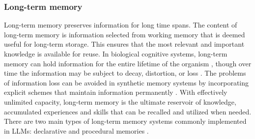 \documentclass[10pt,journal,compsoc]{IEEEtran}
\begin{document}
	\subsubsection{Long-term memory}
	Long-term memory preserves information for long time spans. The content of long-term memory is information selected from working memory that is deemed useful for long-term  storage\cite{chang2011short,baddeley1988long,ericsson1995long}. This ensures that the most relevant and important knowledge is available for reuse. In biological cognitive systems, long-term memory can hold information for the entire lifetime of the organism \cite{bekinschtein2008bdnf,park1996mediators}, though over time the information may be subject to decay, distortion, or loss \cite{hardt2013decay,winocur2010memory}. The problems of information loss can be avoided in synthetic memory systems by incorporating explicit schemes that maintain information permanently \cite{modarressi2024memllm,yamada2023developing}. With effectively unlimited capacity, long-term memory is the ultimate reservoir of knowledge, accumulated experiences and skills that can be recalled and utilized when needed. There are two main types of long-term memory systems commonly implemented in LLMs: declarative and procedural memories \cite{ullman2001neurocognitive}. 
	
	

	
	
\end{document}
